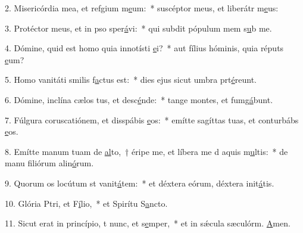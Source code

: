2. Misericórdia mea, et refgium m\uline{e}um:~* suscéptor meus, et liberátr m\uline{e}us:\par 
3. Protéctor meus, et in pso sper\uline{á}vi:~* qui subdit pópulum mem s\uline{u}b me.\par 
4. Dómine, quid est homo quia innotísti \uline{e}i?~* aut fílius hóminis, quia réputs \uline{e}um?\par 
5. Homo vanitáti smilis f\uline{a}ctus est:~* dies ejus sicut umbra prt\uline{é}reunt.\par 
6. Dómine, inclína cælos tus, et desc\uline{é}nde:~* tange montes, et fumg\uline{á}bunt.\par 
7. Fúlgura coruscatiónem, et disspábis \uline{e}os:~* emítte sagíttas tuas, et conturbábs \uline{e}os.\par 
8. Emítte manum tuam de \uline{al}to,~† éripe me, et líbera me d aquis m\uline{u}ltis:~* de manu filiórum alin\uline{ó}rum.\par 
9. Quorum os locútum st vanit\uline{á}tem:~* et déxtera eórum, déxtera init\uline{á}tis.\par 
10. Glória Ptri, et F\uline{í}lio,~* et Spirítu S\uline{a}ncto.\par 
11. Sicut erat in princípio, t nunc, et s\uline{e}mper,~* et in sǽcula sæculórm. \uline{A}men.\par 
